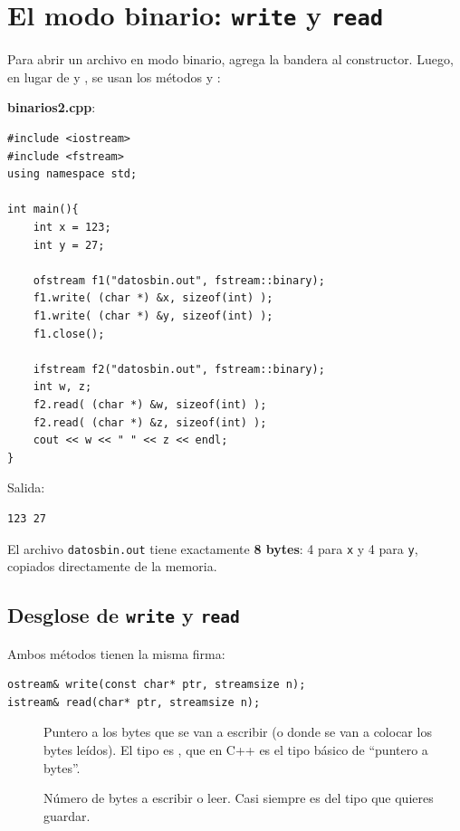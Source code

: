 \documentclass[12pt, oneside]{article}
\begin{document}
\section{El modo binario: \texttt{write} y \texttt{read}}

Para abrir un archivo en modo binario, agrega la bandera
 al constructor.  Luego, en lugar de \cpp{<<} y
\cpp{>>}, se usan los métodos  y :

\textbf{binarios2.cpp}:
\begin{verbatim}
#include <iostream>
#include <fstream>
using namespace std;

int main(){
    int x = 123;
    int y = 27;

    ofstream f1("datosbin.out", fstream::binary);
    f1.write( (char *) &x, sizeof(int) );
    f1.write( (char *) &y, sizeof(int) );
    f1.close();

    ifstream f2("datosbin.out", fstream::binary);
    int w, z;
    f2.read( (char *) &w, sizeof(int) );
    f2.read( (char *) &z, sizeof(int) );
    cout << w << " " << z << endl;
}
\end{verbatim}

Salida:
\begin{verbatim}
123 27
\end{verbatim}

El archivo \texttt{datosbin.out} tiene exactamente \textbf{8 bytes}:
4 para \texttt{x} y 4 para \texttt{y}, copiados directamente de la memoria.

\subsection{Desglose de \texttt{write} y \texttt{read}}

Ambos métodos tienen la misma firma:
\begin{verbatim}
ostream& write(const char* ptr, streamsize n);
istream& read(char* ptr, streamsize n);
\end{verbatim}

\begin{description}
  \item[]
    Puntero a los bytes que se van a escribir (o donde se van a colocar
    los bytes leídos).  El tipo es , que en C++ es el
    tipo básico de ``puntero a bytes''.

  \item[]
    Número de bytes a escribir o leer.  Casi siempre es 
    del tipo que quieres guardar.
\end{description}
\end{document}
